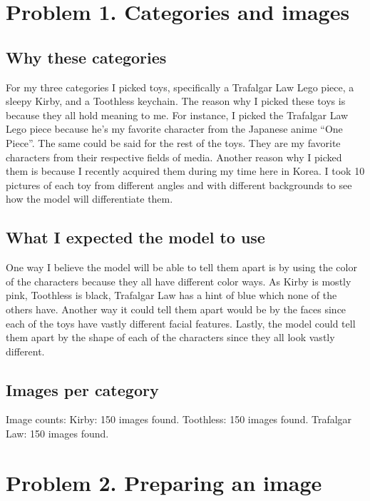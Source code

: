 \documentclass[11pt]{article}
\begin{document}
\makeheader

\section*{Problem 1. Categories and images}

\subsection*{Why these categories}
For my three categories I picked toys, specifically a Trafalgar Law Lego piece,
a sleepy Kirby, and a Toothless keychain. The reason why I picked these toys is
because they all hold meaning to me. For instance, I picked the Trafalgar Law
Lego piece because he's my favorite character from the Japanese anime
``One Piece''. The same could be said for the rest of the toys. They are my
favorite characters from their respective fields of media. Another reason why I
picked them is because I recently acquired them during my time here in Korea. I
took 10 pictures of each toy from different angles and with different
backgrounds to see how the model will differentiate them.

\subsection*{What I expected the model to use}
One way I believe the model will be able to tell them apart is by using the
color of the characters because they all have different color ways. As Kirby is
mostly pink, Toothless is black, Trafalgar Law has a hint of blue which none of
the others have. Another way it could tell them apart would be by the faces
since each of the toys have vastly different facial features. Lastly, the model
could tell them apart by the shape of each of the characters since they all
look vastly different.

\subsection*{Images per category}
Image counts: Kirby: 150 images found. Toothless: 150 images found. Trafalgar
Law: 150 images found.


\section*{Problem 2. Preparing an image}
\end{document}
